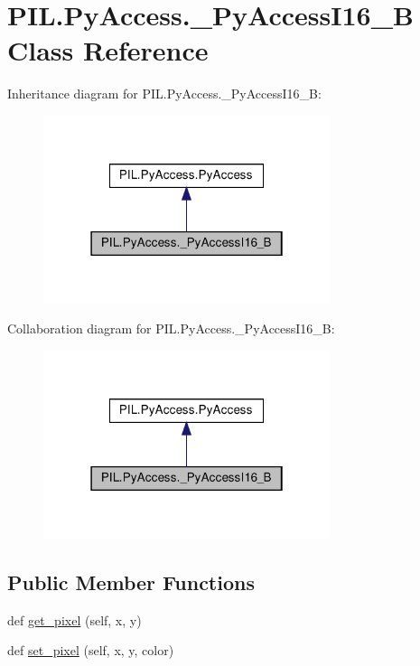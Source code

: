 \hypertarget{classPIL_1_1PyAccess_1_1__PyAccessI16__B}{}\section{P\+I\+L.\+Py\+Access.\+\_\+\+Py\+Access\+I16\+\_\+B Class Reference}
\label{classPIL_1_1PyAccess_1_1__PyAccessI16__B}


Inheritance diagram for P\+I\+L.\+Py\+Access.\+\_\+\+Py\+Access\+I16\+\_\+B\+:
\nopagebreak
\begin{figure}[H]
\begin{center}
\leavevmode
\includegraphics[width=238pt]{classPIL_1_1PyAccess_1_1__PyAccessI16__B__inherit__graph}
\end{center}
\end{figure}


Collaboration diagram for P\+I\+L.\+Py\+Access.\+\_\+\+Py\+Access\+I16\+\_\+B\+:
\nopagebreak
\begin{figure}[H]
\begin{center}
\leavevmode
\includegraphics[width=238pt]{classPIL_1_1PyAccess_1_1__PyAccessI16__B__coll__graph}
\end{center}
\end{figure}
\subsection*{Public Member Functions}
\begin{DoxyCompactItemize}
\item 
def \hyperlink{classPIL_1_1PyAccess_1_1__PyAccessI16__B_a32994100d025d61bce3d6a18cae80282}{get\+\_\+pixel} (self, x, y)
\item 
def \hyperlink{classPIL_1_1PyAccess_1_1__PyAccessI16__B_a4344f9f709ef45ecb91b5a72a03a926c}{set\+\_\+pixel} (self, x, y, color)
\end{DoxyCompactItemize}
